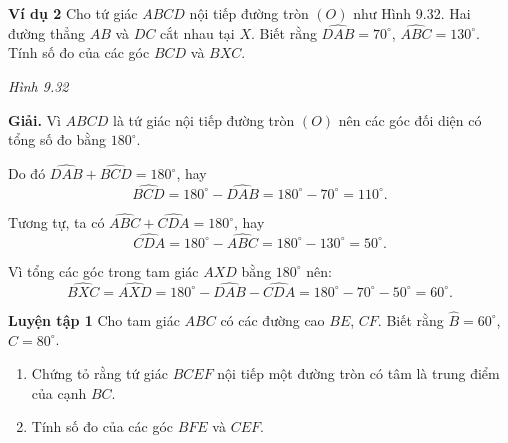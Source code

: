 \begin{lesson}
    \textbf{Ví dụ 2} Cho tứ giác $ABCD$ nội tiếp đường tròn $(O)$ như Hình 9.32. Hai đường thẳng $AB$ và $DC$ cắt nhau tại $X$. Biết rằng $\widehat{DAB}=70^\circ$, $\widehat{ABC}=130^\circ$. Tính số đo của các góc $BCD$ và $BXC$.

    \begin{center}

        \textit{Hình 9.32}
    \end{center}

    \textbf{Giải.} Vì $ABCD$ là tứ giác nội tiếp đường tròn $(O)$ nên các góc đối diện có tổng số đo bằng $180^\circ$.

    Do đó $\widehat{DAB}+\widehat{BCD}=180^\circ$, hay
    \[
        \widehat{BCD}=180^\circ-\widehat{DAB}=180^\circ-70^\circ=110^\circ.
    \]

    Tương tự, ta có $\widehat{ABC}+\widehat{CDA}=180^\circ$, hay
    \[
        \widehat{CDA}=180^\circ-\widehat{ABC}=180^\circ-130^\circ=50^\circ.
    \]

    Vì tổng các góc trong tam giác $AXD$ bằng $180^\circ$ nên:
    \[
        \widehat{BXC}=\widehat{AXD}=180^\circ-\widehat{DAB}-\widehat{CDA}
        =180^\circ-70^\circ-50^\circ=60^\circ.
    \]

    \textbf{Luyện tập 1} Cho tam giác $ABC$ có các đường cao $BE$, $CF$. Biết rằng $\widehat B=60^\circ$, $\widehat C=80^\circ$.
    \begin{enumerate}[label=\alph*)]
        \item Chứng tỏ rằng tứ giác $BCEF$ nội tiếp một đường tròn có tâm là trung điểm của cạnh $BC$.
        \item Tính số đo của các góc $BFE$ và $CEF$.
    \end{enumerate}


\end{lesson}
